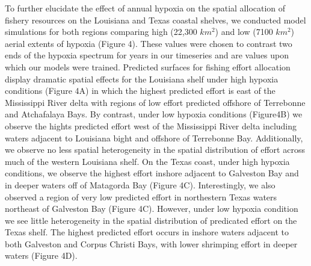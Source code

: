 \documentclass[10pt]{article}
\begin{document}
To further elucidate the effect of annual hypoxia on the spatial allocation of fishery resources on the Louisiana and Texas coastal shelves, we conducted model simulations for both regions comparing high (22,300 $ km^{2} $) and low (7100 $ km^{2} $) aerial extents of hypoxia (Figure 4).  These values were chosen to contrast two ends of the hypoxia spectrum for years in our timeseries and are values upon which our models were trained.  Predicted surfaces for fishing effort allocation display dramatic spatial effects for the Louisiana shelf under high hypoxia conditions (Figure 4A) in which the highest predicted effort is east of the Mississippi River delta with regions of low effort predicted offshore of Terrebonne and Atchafalaya Bays.  By contrast, under low hypoxia conditions (Figure4B) we observe the hights predicted effort west of the Mississippi River delta including waters adjacent to Louisiana bight and offshore of Terrebonne Bay.  Additionally, we observe no less spatial heterogeneity in the spatial distribution of effort across much of the western Louisiana shelf.  On the Texas coast, under high hypoxia conditions, we observe the highest effort inshore adjacent to Galveston Bay and in deeper waters off of Matagorda Bay (Figure 4C).  Interestingly, we also observed a region of very low predicted effort in northestern Texas waters northeast of Galveston Bay (Figure 4C).  However, under low hypoxia condition we see little heterogeneity in the spatial distribution of predicated effort on the Texas shelf.  The highest predicted effort occurs in inshore waters adjacent to both Galveston and Corpus Christi Bays, with lower shrimping effort in deeper waters (Figure 4D).  
 
 
 
\end{document}
